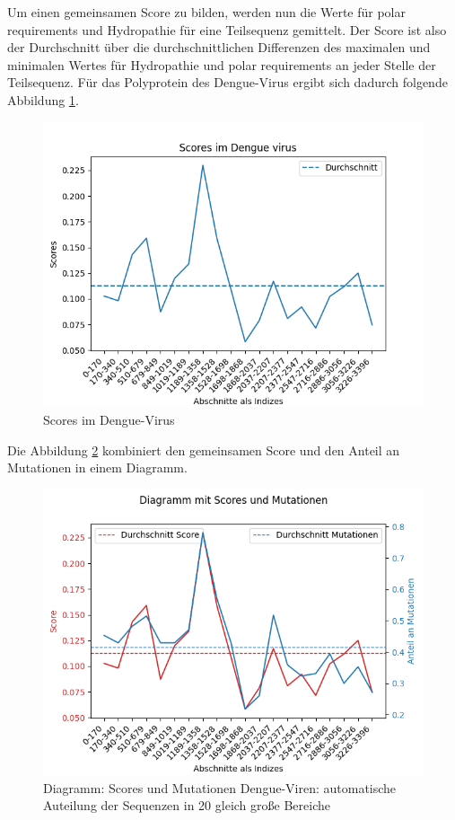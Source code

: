 \documentclass[german,version-2022-01]{uzl-thesis}
\begin{document}
Um einen gemeinsamen Score zu bilden, werden nun die Werte f\"ur polar requirements und Hydropathie f\"ur eine Teilsequenz gemittelt. Der Score ist also der Durchschnitt \"uber die durchschnittlichen Differenzen des maximalen und minimalen Wertes f\"ur Hydropathie und polar requirements an jeder Stelle der Teilsequenz. F\"ur das Polyprotein des Dengue-Virus ergibt sich dadurch folgende Abbildung \ref{fig:Dengue_virus_scores}. 
\begin{figure}[htpb]
  \centering
  \includegraphics[scale=0.75]{Images/Diagramm_Scores_im_Dengue_virus.png}
  \caption{Scores im Dengue-Virus}
  \label{fig:Dengue_virus_scores}
\end{figure}

Die Abbildung \ref{fig:Dengue_virus_scores_and_mutations_bereiche} kombiniert den gemeinsamen Score und den Anteil an Mutationen in einem Diagramm. 
\begin{figure}[htpb]
  \centering
  \includegraphics[scale=0.75]{Images/Diagramm_Scores_und_Mutationen_Dengue_viren_Bereiche.png}
  \caption{Diagramm: Scores und Mutationen Dengue-Viren: automatische Auteilung der Sequenzen in 20 gleich gro\ss{}e Bereiche}
  \label{fig:Dengue_virus_scores_and_mutations_bereiche}
\end{figure}
\end{document}
